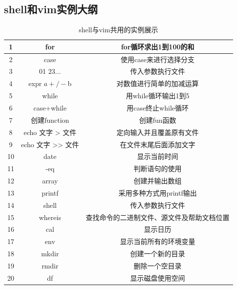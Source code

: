 \documentclass[a4paper, 12pt]{article}
\begin{document}
\subsection{\color{green}shell和vim实例大纲}
\begin{table}[H]
\centering
\caption{\color{red}shell与vim共用的实例展示}
\begin{tabular}{ccc} 
\toprule
\hline
 1&  for    & for循环求出1到100的和  \\ 
\hline
 2&case  & 使用case来进行选择分支 \\ 
\hline
3&$0 $1 $2 $3...  &传入参数执行文件 \\ 
\hline
4&expr $a +/- $b  &对数值进行简单的加减运算 \\ 
\hline
5&while &用while循环输出1到5 \\ 
\hline
6&case+while  &用case终止while循环 \\ 
\hline
7&创建function  &创建fun函数  \\ 
\hline
 8&echo 文字 > 文件 &定向输入并且覆盖原有文件  \\ 
\hline
9&echo 文字 >> 文件  &在文件末尾后面添加文字 \\ 
\hline
 10&date &显示当前时间  \\ 
\hline
11&-eq &判断语句的使用 \\ 
\hline
12&array  &创建并输出数组  \\ 
\hline
13&printf  &采用多种方式用printf输出   \\ 
\hline
14&shell  &传入参数执行文件  \\ 
 \hline
 15&whereis &查找命令的二进制文件、源文件及帮助文档位置  \\ 
 \hline
 16&cal  &显示日历  \\ 
 \hline
 17&env  &显示当前所有的环境变量  \\ 
 \hline
 18&mkdir  &创建一个新的目录  \\ 
 \hline
 19&rmdir &删除一个空目录  \\ 
 \hline
 20&df&显示磁盘使用空间\\
 \hline
\bottomrule
\end{tabular}
\end{table}



    
\end{document}
